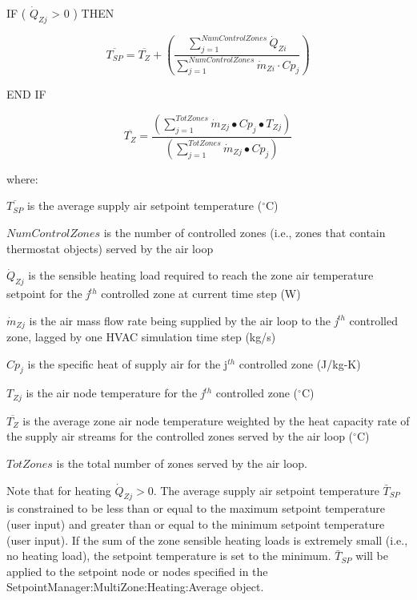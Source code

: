 IF ( \({\dot Q_{Zj}}\) \textgreater{} 0 ) THEN

\begin{equation}
\overline {{T_{SP}}}  = \overline {{T_Z}}  + \left( {\frac{{\sum\limits_{j = 1}^{NumControlZones} {{{\dot Q}_{Zi}}} }}{{\sum\limits_{j = 1}^{NumControlZones} {{{\dot m}_{Zi}}\cdot C{p_j}} }}} \right)
\end{equation}

END IF

\begin{equation}
{\overline{T_Z}} = {\frac{{\left( {\sum\limits_{j = 1}^{TotZones} {{{\dot m}_{Zj}} \bullet } C{p_j} \bullet {T_{Zj}}} \right)}}{\left( {\sum\limits_{j = 1}^{TotZones} {{{\dot m}_{Zj}} \bullet } C{p_j}} \right)}}
\end{equation}

where:

\({\overline{T_{SP}}}\) is the average supply air setpoint temperature (\(^{\circ}\)C)

\(NumControlZones\) is the number of controlled zones (i.e., zones that contain thermostat objects) served by the air loop

\({\dot Q_{Zj}}\) is the sensible heating load required to reach the zone air temperature setpoint for the \emph{j}\(^{th}\) controlled zone at current time step (W)

\({\dot m_{Zj}}\) is the air mass flow rate being supplied by the air loop to the \emph{j}\(^{th}\) controlled zone, lagged by one HVAC simulation time step (kg/s)

\(C{p_j}\) is the specific heat of supply air for the j\(^{th}\) controlled zone (J/kg-K)

\({T_{Zj}}\) is the air node temperature for the \emph{j}\(^{th}\) controlled zone (\(^{\circ}\)C)

\({\overline{T_Z}}\) is the average zone air node temperature weighted by the heat capacity rate of the supply air streams for the controlled zones served by the air loop (\(^{\circ}\)C)

\(TotZones\) is the total number of zones served by the air loop.

Note that for heating \({\dot Q_{Zj}} > 0\). The average supply air setpoint temperature \({\bar T_{SP}}\) is constrained to be less than or equal to the maximum setpoint temperature (user input) and greater than or equal to the minimum setpoint temperature (user input). If the sum of the zone sensible heating loads is extremely small (i.e., no heating load), the setpoint temperature is set to the minimum. \({\bar T_{SP}}\) will be applied to the setpoint node or nodes specified in the SetpointManager:MultiZone:Heating:Average object.

